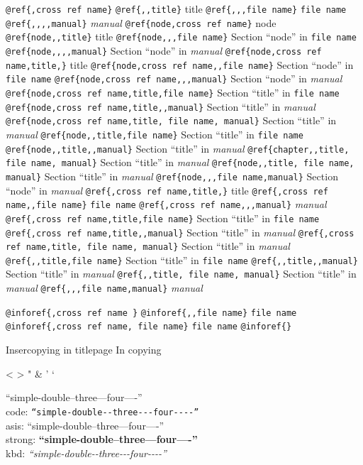 \documentclass{book}
\begin{document}
\begin{titlepage}
\texttt{@ref\{,cross ref name\}} 
\texttt{@ref\{,,title\}} title
\texttt{@ref\{,,,file name\}} \texttt{file name}
\texttt{@ref\{,,,,manual\}} \textsl{manual}
\texttt{@ref\{node,cross ref name\}} node
\texttt{@ref\{node,,title\}} title
\texttt{@ref\{node,,,file name\}} Section ``node'' in \texttt{file name}
\texttt{@ref\{node,,,,manual\}} Section ``node'' in \textsl{manual}
\texttt{@ref\{node,cross ref name,title,\}} title
\texttt{@ref\{node,cross ref name,,file name\}} Section ``node'' in \texttt{file name}
\texttt{@ref\{node,cross ref name,,,manual\}} Section ``node'' in \textsl{manual}
\texttt{@ref\{node,cross ref name,title,file name\}} Section ``title'' in \texttt{file name}
\texttt{@ref\{node,cross ref name,title,,manual\}} Section ``title'' in \textsl{manual}
\texttt{@ref\{node,cross ref name,title, file name, manual\}} Section ``title'' in \textsl{manual}
\texttt{@ref\{node,,title,file name\}} Section ``title'' in \texttt{file name}
\texttt{@ref\{node,,title,,manual\}} Section ``title'' in \textsl{manual}
\texttt{@ref\{chapter,,title, file name, manual\}} Section ``title'' in \textsl{manual}
\texttt{@ref\{node,,title, file name, manual\}} Section ``title'' in \textsl{manual}
\texttt{@ref\{node,,,file name,manual\}} Section ``node'' in \textsl{manual}
\texttt{@ref\{,cross ref name,title,\}} title
\texttt{@ref\{,cross ref name,,file name\}} \texttt{file name}
\texttt{@ref\{,cross ref name,,,manual\}} \textsl{manual}
\texttt{@ref\{,cross ref name,title,file name\}} Section ``title'' in \texttt{file name}
\texttt{@ref\{,cross ref name,title,,manual\}} Section ``title'' in \textsl{manual}
\texttt{@ref\{,cross ref name,title, file name, manual\}} Section ``title'' in \textsl{manual}
\texttt{@ref\{,,title,file name\}} Section ``title'' in \texttt{file name}
\texttt{@ref\{,,title,,manual\}} Section ``title'' in \textsl{manual}
\texttt{@ref\{,,title, file name, manual\}} Section ``title'' in \textsl{manual}
\texttt{@ref\{,,,file name,manual\}} \textsl{manual}

\texttt{@inforef\{,cross ref name \}} 
\texttt{@inforef\{,,file name\}} \texttt{file name}
\texttt{@inforef\{,cross ref name, file name\}} \texttt{file name}
\texttt{@inforef\{\}} 



Insercopying in titlepage
In copying

<
>
"
\&
'
`

``simple-double--three---four----''\leavevmode{}\\
code: \texttt{``simple-double{-}{-}three{-}{-}{-}four{-}{-}{-}-''} \leavevmode{}\\
asis: ``simple-double--three---four----'' \leavevmode{}\\
strong: \textbf{``simple-double--three---four----''} \leavevmode{}\\
kbd: {\ttfamily\textsl{``simple-double{-}{-}three{-}{-}{-}four{-}{-}{-}-''}} \leavevmode{}\\


\end{titlepage}
\end{document}
